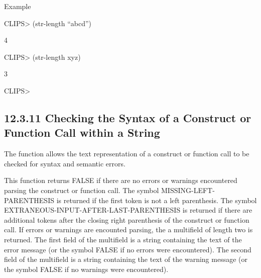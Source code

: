\documentclass[letterpaper,10pt,english]{sphinxmanual}
\begin{document}

\begin{sphinxVerbatim}[commandchars=\\\{\}]
 
\end{sphinxVerbatim}

Example

CLIPS\textgreater{} (str-length “abcd”)

4

CLIPS\textgreater{} (str-length xyz)

3

CLIPS\textgreater{}


\subsection{12.3.11 Checking the Syntax of a Construct or Function Call within a String}
\label{\detokenize{actions:checking-the-syntax-of-a-construct-or-function-call-within-a-string}}
The function  allows the text representation of a
construct or function call to be checked for syntax and semantic errors.


\begin{sphinxVerbatim}[commandchars=\\\{\}]
 
\end{sphinxVerbatim}

This function returns FALSE if there are no errors or warnings
encountered parsing the construct or function call. The symbol
MISSING-LEFT-PARENTHESIS is returned if the first token is not a left
parenthesis. The symbol EXTRANEOUS-INPUT-AFTER-LAST-PARENTHESIS is
returned if there are additional tokens after the closing right
parenthesis of the construct or function call. If errors or warnings are
encounted parsing, the a multifield of length two is returned. The first
field of the multifield is a string containing the text of the error
message (or the symbol FALSE if no errors were encountered). The second
field of the multifield is a string containing the text of the warning
message (or the symbol FALSE if no warnings were encountered).
\end{document}
